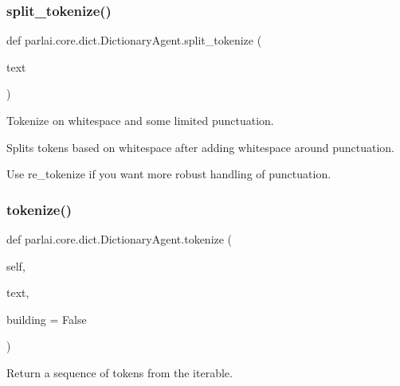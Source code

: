 \subsubsection{\texorpdfstring{split\+\_\+tokenize()}{split\_tokenize()}}
{\footnotesize\ttfamily def parlai.\+core.\+dict.\+Dictionary\+Agent.\+split\+\_\+tokenize (\begin{DoxyParamCaption}\item[{}]{text }\end{DoxyParamCaption})\hspace{0.3cm}{\ttfamily [static]}}

\begin{DoxyVerb}Tokenize on whitespace and some limited punctuation.

Splits tokens based on whitespace after adding whitespace around
punctuation.

Use re_tokenize if you want more robust handling of punctuation.
\end{DoxyVerb}
 \mbox{\label{classparlai_1_1core_1_1dict_1_1DictionaryAgent_aca7e5edfd6502701277cb83b75ff4e96}} 
\subsubsection{\texorpdfstring{tokenize()}{tokenize()}}
{\footnotesize\ttfamily def parlai.\+core.\+dict.\+Dictionary\+Agent.\+tokenize (\begin{DoxyParamCaption}\item[{}]{self,  }\item[{}]{text,  }\item[{}]{building = {\ttfamily False} }\end{DoxyParamCaption})}

\begin{DoxyVerb}Return a sequence of tokens from the iterable.
\end{DoxyVerb}
 \mbox{\label{classparlai_1_1core_1_1dict_1_1DictionaryAgent_abc3baf742422fc7cdaece698224709d4}} 

